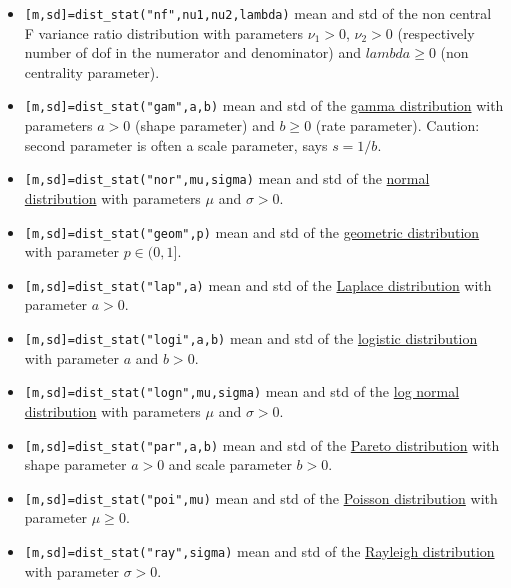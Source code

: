 \begin{mandescription}
\begin{itemize}
\item {} \verb![m,sd]=dist_stat("nf",nu1,nu2,lambda)! 
mean and std of the non central F variance ratio distribution with parameters $\nu_1 > 0$, $\nu_2 > 0$ 
(respectively number of dof in the numerator and denominator) and $lambda \ge 0$ (non  centrality parameter).


\item {} \verb![m,sd]=dist_stat("gam",a,b)! mean and std  of the 
\hyperlink{gampdf}{gamma distribution} with parameters $a > 0$ (shape parameter) and $b \ge 0$
  (rate parameter). Caution: second parameter is often a scale parameter, says $s = 1/b$.


\item {} \verb![m,sd]=dist_stat("nor",mu,sigma)! mean and std 
of the  \hyperlink{norpdf}{normal distribution} with parameters $\mu$ and $\sigma > 0$.


\item {} \verb![m,sd]=dist_stat("geom",p)! mean and std 
of the \hyperlink{geompdf}{geometric distribution} with parameter $p \in (0,1]$.


\item {} \verb![m,sd]=dist_stat("lap",a)! mean and std 
of the \hyperlink{lappdf}{Laplace distribution} with parameter $a > 0$.

\item {} \verb![m,sd]=dist_stat("logi",a,b)! mean and std 
of the \hyperlink{logipdf}{logistic distribution} with parameter $a$ and $b > 0$.

\item {} \verb![m,sd]=dist_stat("logn",mu,sigma)! mean and std 
of the  \hyperlink{lognpdf}{log normal distribution} with parameters $\mu$ and $\sigma > 0$.

\item {} \verb![m,sd]=dist_stat("par",a,b)! mean and std 
of the \hyperlink{parpdf}{Pareto  distribution} with shape parameter $a > 0$ and scale parameter $b > 0$.

\item {} \verb![m,sd]=dist_stat("poi",mu)! mean and std 
of the \hyperlink{poipdf}{Poisson distribution} with parameter $\mu \ge 0$.


\item {} \verb![m,sd]=dist_stat("ray",sigma)! mean and std 
of the \hyperlink{raypdf}{Rayleigh distribution} with parameter $\sigma > 0$.


\end{itemize}
\end{mandescription}
